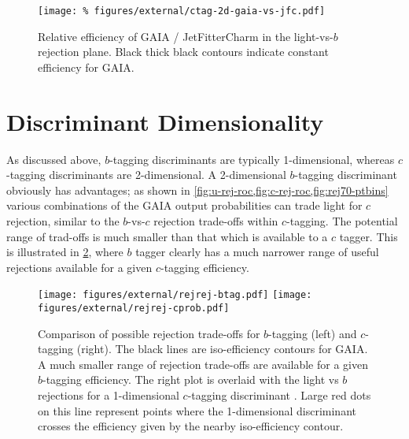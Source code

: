 \begin{figure}
  \begin{center}
  \texttt{[image: \%
    figures/external/ctag-2d-gaia-vs-jfc.pdf]}
  \caption[Charm jet efficiency comparison in duel-rejection plane]{%
    Relative efficiency of GAIA / JetFitterCharm in the light-vs-$b$ rejection plane. Black thick black contours indicate constant efficiency for GAIA.}
  \label{fig:ctag-gaia-vs-jfc}
  \end{center}
\end{figure}


\section{Discriminant Dimensionality}

As discussed above, $b$-tagging discriminants are typically 1-dimensional, whereas $c$-tagging discriminants are 2-dimensional.
A 2-dimensional $b$-tagging discriminant obviously has advantages; as shown in \cref{fig:u-rej-roc,fig:c-rej-roc,fig:rej70-ptbins} various combinations of the GAIA output probabilities can trade light for $c$ rejection, similar to the $b$-vs-$c$ rejection trade-offs within $c$-tagging. The potential range of trad-offs is much smaller than that which is available to a $c$ tagger.
This is illustrated in \cref{fig:btag-vs-ctag-rejrej}, where $b$ tagger clearly has a much narrower range of useful rejections available for a given $c$-tagging efficiency.

\begin{figure}
  \texttt{[image: figures/external/rejrej-btag.pdf]}
  \texttt{[image: figures/external/rejrej-cprob.pdf]}
  \caption[Rejection Trade-offs for $b$ and $c$ tagging]{%
    Comparison of possible rejection trade-offs for $b$-tagging (left) and $c$-tagging (right).
The black lines are iso-efficiency contours for GAIA.
A much smaller range of rejection trade-offs are available for a given $b$-tagging efficiency. The right plot is overlaid with the light vs $b$ rejections for a 1-dimensional $c$-tagging discriminant . Large red dots on this line represent points where the 1-dimensional discriminant crosses the efficiency given by the nearby iso-efficiency contour.}
  \label{fig:btag-vs-ctag-rejrej}
\end{figure}

